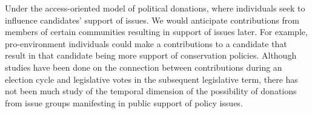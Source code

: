 \documentclass[12pt,]{article}
\begin{document}
Under the access-oriented model of political donations, where
individuals seek to influence candidates' support of issues. We would
anticipate contributions from members of certain communities resulting
in support of issues later. For example, pro-environment individuals
could make a contributions to a candidate that result in that candidate
being more support of conservation policies. Although studies have been
done on the connection between contributions during an election cycle
and legislative votes in the subsequent legislative term, there has not
been much study of the temporal dimension of the possibility of
donations from issue groups manifesting in public support of policy
issues.





\newpage
\singlespacing 
\end{document}
